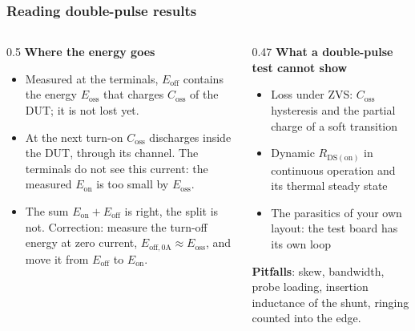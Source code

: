 \begin{frame}
	\frametitle{Reading double-pulse results}
	\begin{columns}[T]
		\begin{column}{0.5\textwidth}
			\small
			\textbf{Where the energy goes}
			\begin{itemize}
				\item Measured at the terminals, $E_\mathrm{off}$ contains the energy $E_\mathrm{oss}$ that charges $C_\mathrm{oss}$ of the DUT; it is not lost yet.
				\item At the next turn-on $C_\mathrm{oss}$ discharges inside the DUT, through its channel. The terminals do not see this current: the measured $E_\mathrm{on}$ is too small by $E_\mathrm{oss}$.
				\item The sum $E_\mathrm{on}+E_\mathrm{off}$ is right, the split is not. Correction: measure the turn-off energy at zero current, $E_\mathrm{off,0A}\approx E_\mathrm{oss}$, and move it from $E_\mathrm{off}$ to $E_\mathrm{on}$.
			\end{itemize}
		\end{column}
		\begin{column}{0.47\textwidth}
			\small
			\textbf{What a double-pulse test cannot show}
			\begin{itemize}
				\item Loss under ZVS: $C_\mathrm{oss}$ hysteresis and the partial charge of a soft transition
				\item Dynamic $R_\mathrm{DS(on)}$ in continuous operation and its thermal steady state
				\item The parasitics of your own layout: the test board has its own loop
			\end{itemize}
			\textbf{Pitfalls}: skew, bandwidth, probe loading, insertion inductance of the shunt, ringing counted into the edge.
		\end{column}
	\end{columns}
\end{frame}

